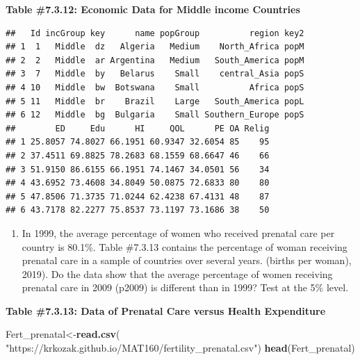 \documentclass[
]{book}
\newenvironment{Shaded}{\begin{snugshade}}{\end{snugshade}}
\newcommand{\KeywordTok}[1]{\textcolor[rgb]{0.13,0.29,0.53}{\textbf{#1}}}
\newcommand{\NormalTok}[1]{#1}
\newcommand{\OperatorTok}[1]{\textcolor[rgb]{0.81,0.36,0.00}{\textbf{#1}}}
\newcommand{\StringTok}[1]{\textcolor[rgb]{0.31,0.60,0.02}{#1}}
\providecommand{\tightlist}{%
  \setlength{\itemsep}{0pt}\setlength{\parskip}{0pt}}
\begin{document}
\textbf{Table \#7.3.12: Economic Data for Middle income Countries}

\begin{Shaded}
\end{Shaded}

\begin{verbatim}
##   Id incGroup key      name popGroup          region key2
## 1  1   Middle  dz   Algeria   Medium    North_Africa popM
## 2  2   Middle  ar Argentina   Medium   South_America popM
## 3  7   Middle  by   Belarus    Small    central_Asia popS
## 4 10   Middle  bw  Botswana    Small          Africa popS
## 5 11   Middle  br    Brazil    Large   South_America popL
## 6 12   Middle  bg  Bulgaria    Small Southern_Europe popS
##        ED     Edu      HI     QOL      PE OA Relig
## 1 25.8057 74.8027 66.1951 60.9347 32.6054 85    95
## 2 37.4511 69.8825 78.2683 68.1559 68.6647 46    66
## 3 51.9150 86.6155 66.1951 74.1467 34.0501 56    34
## 4 43.6952 73.4608 34.8049 50.0875 72.6833 80    80
## 5 47.8506 71.3735 71.0244 62.4238 67.4131 48    87
## 6 43.7178 82.2277 75.8537 73.1197 73.1686 38    50
\end{verbatim}

\begin{enumerate}
\def\labelenumi{\arabic{enumi}.}
\setcounter{enumi}{5}
\tightlist
\item
  In 1999, the average percentage of women who received prenatal care per country is 80.1\%. Table \#7.3.13 contains the percentage of woman receiving prenatal care in a sample of countries over several years. (births per woman), 2019). Do the data show that the average percentage of women receiving prenatal care in 2009 (p2009) is different than in 1999? Test at the 5\% level.
\end{enumerate}

\textbf{Table \#7.3.13: Data of Prenatal Care versus Health Expenditure}

\begin{Shaded}
\begin{Highlighting}[]
\NormalTok{Fert_prenatal<-}\KeywordTok{read.csv}\NormalTok{(}
  \StringTok{"https://krkozak.github.io/MAT160/fertility_prenatal.csv"}\NormalTok{)}
\KeywordTok{head}\NormalTok{(Fert_prenatal)}
\end{Highlighting}
\end{Shaded}
\end{document}
